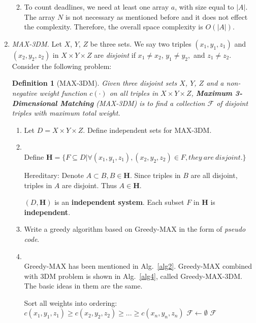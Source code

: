 \documentclass[12pt,a4paper]{article}
\makeatletter
\newtheorem*{solution}{Solution}
\newtheorem{definition}{Definition}
\theoremstyle{definition}
\renewenvironment{solution}[1][Solution] {\par\pushQED{\qed}\normalfont\topsep6\p@\@plus6\p@\relax\trivlist\item[\hskip\labelsep\bfseries#1\@addpunct{.}]\ignorespaces}{\popQED\endtrivlist\@endpefalse} \makeatother
\makeatother
\begin{document}
\begin{enumerate}
\begin{enumerate}
\begin{solution}
To count deadlines, we need at least one array $a$, with size equal to $|A|$. The array $N$ is not necessary as mentioned before and it does not effect the complexity. Therefore, the overall space complexity is $O(|A|)$.

            \end{solution}
    \end{enumerate}
\item \textit{MAX-3DM.} Let $X$, $Y$, $Z$ be three sets. We say two triples $\left(x_{1}, y_{1}, z_{1}\right)$ and $\left(x_{2}, y_{2}, z_{2}\right)$ in $X \times Y \times Z$ are \textit{disjoint} if $x_{1} \neq x_{2}$, $y_{1} \neq y_{2},$ and $z_{1} \neq z_{2}$. Consider the following problem:
    
    \begin{definition}[MAX-3DM] 
        Given three disjoint sets $X$, $Y$, $Z$ and a non-negative weight function $c(\cdot)$ on all triples in $X \times Y \times Z$, \textbf{Maximum 3-Dimensional Matching} (MAX-3DM) is to find a collection $\mathcal{F}$ of disjoint triples with maximum total weight.
    \end{definition}

    \begin{enumerate}
    	\item Let $D = X \times Y \times Z$. Define independent sets for MAX-3DM.
	 \begin{solution}
	 ~\\
	    Define $\mathbf{H}=\{F\subseteq D| \forall (x_1,y_1,z_1), (x_2,y_2,z_2)\in F, they\ are\ disjoint.\}$
	    
	    {\color{blue}Hereditary}: Denote $A\subset B, B\in \mathbf{H}$. Since triples in $B$ are all disjoint, triples in $A$ are disjoint. Thus $A\in \mathbf{H}$.
	    
	    $(D, \mathbf{H})$ is an \textbf{independent system}. Each subset $F$ in $\mathbf{H}$ is \textbf{independent}.
    	    \end{solution}
	    
    	\item Write a greedy algorithm based on Greedy-MAX in the form of \emph{pseudo code}. \label{Item-Greedy}
	\begin{solution}
	~\\	
	Greedy-MAX has been mentioned in Alg.~\ref{alg2}. Greedy-MAX combined with 3DM problem is shown in Alg.~\ref{alg4}, called Greedy-MAX-3DM. The basic ideas in them are the same.
	
		\begin{algorithm}[H]
   \caption{Greedy-MAX-3DM}\label{alg4}
		Sort all weights into ordering: $c(x_1,y_1,z_1)\geq c(x_2,y_2,z_2) \geq ... \geq c(x_n,y_n,z_n)$\;
		$\mathcal{F} \leftarrow \emptyset $\;
		\Return $\mathcal{F}$\;
	\end{algorithm}


\end{solution}
\end{enumerate}
\end{enumerate}
\end{document}
